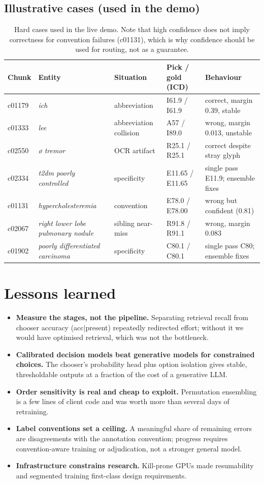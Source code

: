 \documentclass[11pt]{article}
\begin{document}
\subsection{Illustrative cases (used in the demo)}
\begin{table}[H]
\centering
\footnotesize
\begin{tabularx}{\linewidth}{@{}llXll@{}}
\toprule
Chunk & Entity & Situation & Pick / gold (ICD) & Behaviour\\
\midrule
c01179 & \emph{ich} & abbreviation & I61.9 / I61.9 & correct, margin 0.39, stable\\
c01333 & \emph{lee} & abbreviation collision & A57 / I89.0 & wrong, margin 0.013, unstable\\
c02550 & \emph{ø tremor} & OCR artifact & R25.1 / R25.1 & correct despite stray glyph\\
c02334 & \emph{t2dm poorly controlled} & specificity & E11.65 / E11.65 & single pass E11.9; ensemble fixes\\
c01131 & \emph{hypercholesteremia} & convention & E78.0 / E78.00 & wrong but confident (0.81)\\
c02067 & \emph{right lower lobe pulmonary nodule} & sibling near-miss & R91.8 / R91.1 & wrong, margin 0.083\\
c01902 & \emph{poorly differentiated carcinoma} & specificity & C80.1 / C80.1 & single pass C80; ensemble fixes\\
\bottomrule
\end{tabularx}
\caption{Hard cases used in the live demo. Note that high confidence does not imply
correctness for convention failures (c01131), which is why confidence should be used for
routing, not as a guarantee.}
\end{table}

\section{Lessons learned}
\begin{itemize}[leftmargin=1.2em]
  \item \textbf{Measure the stages, not the pipeline.} Separating retrieval recall from
  chooser accuracy (acc$|$present) repeatedly redirected effort; without it we would have
  optimised retrieval, which was not the bottleneck.
  \item \textbf{Calibrated decision models beat generative models for constrained choices.}
  The chooser's probability head plus option isolation gives stable, thresholdable outputs
  at a fraction of the cost of a generative LLM.
  \item \textbf{Order sensitivity is real and cheap to exploit.} Permutation ensembling is
  a few lines of client code and was worth more than several days of retraining.
  \item \textbf{Label conventions set a ceiling.} A meaningful share of remaining errors are
  disagreements with the annotation convention; progress requires convention-aware training
  or adjudication, not a stronger general model.
  \item \textbf{Infrastructure constrains research.} Kill-prone GPUs made resumability and
  segmented training first-class design requirements.
\end{itemize}
\end{document}
